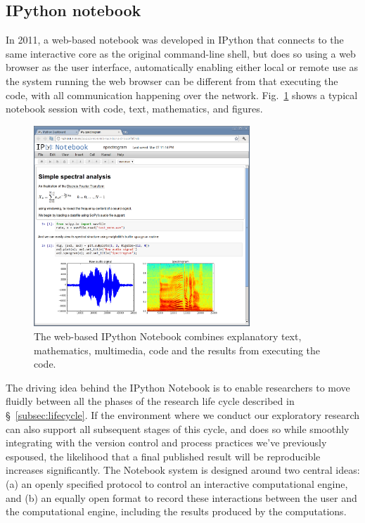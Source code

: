 \documentclass[11pt,oneside,english]{article}
\begin{document}
\subsection{IPython notebook}\label{subsec:IPython}

In 2011, a web-based notebook was developed in IPython that connects to the
same interactive core as the original command-line shell, but does so using a
web browser as the user interface, automatically enabling either local or
remote use as the system running the web browser can be different from that
executing the code, with all communication happening over the network.
Fig.~\ref{fig:IPython-notebook} shows a typical notebook session with code,
text, mathematics, and figures.

\begin{figure}
  \begin{centering}
    \includegraphics[width=3.2in]{fig/ipython-notebook-specgram.png}\par
  \end{centering}

  \caption{\label{fig:IPython-notebook}The web-based IPython Notebook combines
    explanatory text, mathematics, multimedia, code and the results from
    executing the code.}
\end{figure}

The driving idea behind the IPython Notebook is to enable researchers to move
fluidly between all the phases of the research life cycle described in
§~\ref{subsec:lifecycle}.  If the environment where we conduct our
exploratory research can also support all subsequent stages of this cycle, and
does so while smoothly integrating with the version control and process
practices we've previously espoused, the likelihood that a final published
result will be reproducible increases significantly.  The Notebook system is
designed around two central ideas: (a) an openly specified protocol to control
an interactive computational engine, and (b) an equally open format to record
these interactions between the user and the computational engine, including the
results produced by the computations.
\end{document}
